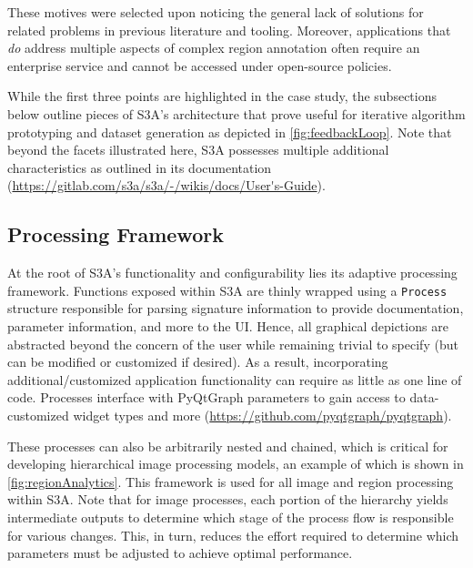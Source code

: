 These motives were selected upon noticing the general lack of solutions for related problems in previous literature and tooling.
Moreover, applications that \emph{do} address multiple aspects of complex region annotation often require an enterprise service and cannot be accessed under open-source policies.

While the first three points are highlighted in the case study, the subsections below outline pieces of S3A's architecture that prove useful for iterative algorithm prototyping and dataset generation as depicted in \autoref{fig:feedbackLoop}.
Note that beyond the facets illustrated here, S3A possesses multiple additional characteristics as outlined in its documentation (\url{https://gitlab.com/s3a/s3a/-/wikis/docs/User's-Guide}).

\makeFeedbackLoopFig

\subsection{Processing Framework}\label{sec:procFramework}
At the root of S3A's functionality and configurability lies its adaptive processing framework.
Functions exposed within S3A are thinly wrapped using a \texttt{Process} structure responsible for parsing signature information to provide documentation, parameter information, and more to the UI.
Hence, all graphical depictions are abstracted beyond the concern of the user while remaining trivial to specify (but can be modified or customized if desired).
As a result, incorporating additional/customized application functionality can require as little as one line of code.
Processes interface with PyQtGraph parameters to gain access to data-customized widget types and more (\url{https://github.com/pyqtgraph/pyqtgraph}).

These processes can also be arbitrarily nested and chained, which is critical for developing hierarchical image processing models, an example of which is shown in \autoref{fig:regionAnalytics}.
This framework is used for all image and region processing within S3A.
Note that for image processes, each portion of the hierarchy yields intermediate outputs to determine which stage of the process flow is responsible for various changes.
This, in turn, reduces the effort required to determine which parameters must be adjusted to achieve optimal performance.

\makeRegionAnalyticsFig

